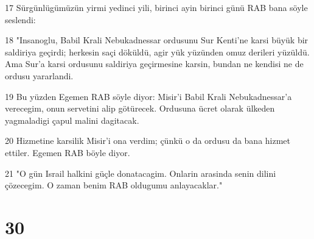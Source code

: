 \par 17 Sürgünlügümüzün yirmi yedinci yili, birinci ayin birinci günü RAB bana söyle seslendi:
\par 18 "Insanoglu, Babil Krali Nebukadnessar ordusunu Sur Kenti'ne karsi büyük bir saldiriya geçirdi; herkesin saçi döküldü, agir yük yüzünden omuz derileri yüzüldü. Ama Sur'a karsi ordusunu saldiriya geçirmesine karsin, bundan ne kendisi ne de ordusu yararlandi.
\par 19 Bu yüzden Egemen RAB söyle diyor: Misir'i Babil Krali Nebukadnessar'a verecegim, onun servetini alip götürecek. Ordusuna ücret olarak ülkeden yagmaladigi çapul malini dagitacak.
\par 20 Hizmetine karsilik Misir'i ona verdim; çünkü o da ordusu da bana hizmet ettiler. Egemen RAB böyle diyor.
\par 21 "O gün Israil halkini güçle donatacagim. Onlarin arasinda senin dilini çözecegim. O zaman benim RAB oldugumu anlayacaklar."

\chapter{30}

